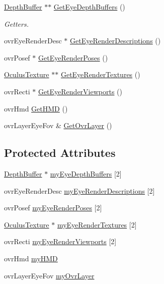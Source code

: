 \begin{DoxyCompactItemize}
\hyperlink{class_depth_buffer}{Depth\+Buffer} $\ast$$\ast$ \hyperlink{class_v_r_layer_a1dd1511b144b8d3ec95248c9c3bb5ce0}{Get\+Eye\+Depth\+Buffers} ()
\begin{DoxyCompactList}\small\item\em Getters. \end{DoxyCompactList}\item 
ovr\+Eye\+Render\+Desc $\ast$ \hyperlink{class_v_r_layer_af0f7b3a0aec2d5175ae334ffa60bcdfd}{Get\+Eye\+Render\+Descriptions} ()
\item 
ovr\+Posef $\ast$ \hyperlink{class_v_r_layer_a9e90f858498e244c77482906bfefbd62}{Get\+Eye\+Render\+Poses} ()
\item 
\hyperlink{class_oculus_texture}{Oculus\+Texture} $\ast$$\ast$ \hyperlink{class_v_r_layer_a4c4ec79e724a3f179f15a64d5e1287f0}{Get\+Eye\+Render\+Textures} ()
\item 
ovr\+Recti $\ast$ \hyperlink{class_v_r_layer_abdb1657fca98fe38f25ac5806af70a0d}{Get\+Eye\+Render\+Viewports} ()
\item 
ovr\+Hmd \hyperlink{class_v_r_layer_ad7d68fc8325f5d8588dda33edd8b63f0}{Get\+H\+MD} ()
\item 
ovr\+Layer\+Eye\+Fov \& \hyperlink{class_v_r_layer_a338e5d2fd9c1f38c0757eeb735d5fe41}{Get\+Ovr\+Layer} ()
\end{DoxyCompactItemize}
\subsection*{Protected Attributes}
\begin{DoxyCompactItemize}
\item 
\hyperlink{class_depth_buffer}{Depth\+Buffer} $\ast$ \hyperlink{class_v_r_layer_a158518a0d3b7437032bb8b9dd513830f}{my\+Eye\+Depth\+Buffers} \mbox{[}2\mbox{]}
\item 
ovr\+Eye\+Render\+Desc \hyperlink{class_v_r_layer_a61e147e1041337a9849d3618aa782a82}{my\+Eye\+Render\+Descriptions} \mbox{[}2\mbox{]}
\item 
ovr\+Posef \hyperlink{class_v_r_layer_a0429a4b04ab3c5e51f5bd638519acfa3}{my\+Eye\+Render\+Poses} \mbox{[}2\mbox{]}
\item 
\hyperlink{class_oculus_texture}{Oculus\+Texture} $\ast$ \hyperlink{class_v_r_layer_a47a680aacb39848eff2148445cbba172}{my\+Eye\+Render\+Textures} \mbox{[}2\mbox{]}
\item 
ovr\+Recti \hyperlink{class_v_r_layer_ab79ac408b474f49eb0ec4fb5603752ff}{my\+Eye\+Render\+Viewports} \mbox{[}2\mbox{]}
\item 
ovr\+Hmd \hyperlink{class_v_r_layer_ab7dbb8c74485a7546bd77f6817e76da2}{my\+H\+MD}
\item 
ovr\+Layer\+Eye\+Fov \hyperlink{class_v_r_layer_a427baf6b2cb1ef51254fd83d0c9179f8}{my\+Ovr\+Layer}
\end{DoxyCompactItemize}
